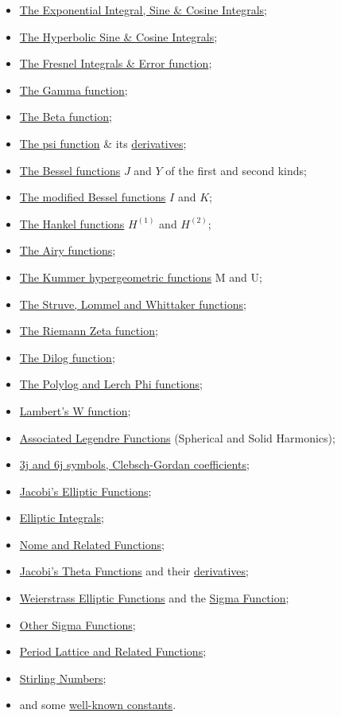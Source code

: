 \begin{itemize}
\item \hyperlink{INTEGF}{The Exponential Integral, Sine \& Cosine Integrals};
\item \hyperlink{INTEGF}{The Hyperbolic Sine \& Cosine Integrals};
\item \hyperlink{INTEGF}{The Fresnel Integrals \& Error function};
\item \hyperlink{GAMMF}{The Gamma function};
\item \hyperlink{BETAF}{The Beta function};
\item \hyperlink{DIGAM}{The psi function} \& its \hyperlink{POLYGAM}{derivatives};
\item \hyperlink{BESSELF}{The Bessel functions} $J$ and $Y$ of the first and second kinds;
\item \hyperlink{BESSELF}{The modified Bessel functions} $I$ and $K$;
\item \hyperlink{BESSELF}{The Hankel functions} $H^{(1)}$ and $H^{(2)}$;
\item \hyperlink{AIRYF}{The Airy functions};
\item \hyperlink{HYPERGEOM}{The Kummer hypergeometric functions} M and U;
\item \hyperlink{HYPERGEOM}{The Struve, Lommel and Whittaker functions};
\item \hyperlink{RIEMZETA}{The Riemann Zeta function};
\item \hyperlink{POLYLOG}{The Dilog function};
\item \hyperlink{POLYLOG}{The Polylog and Lerch Phi functions};
\item \hyperlink{LAMBERTW}{Lambert's W function};
\item \hyperlink{SPHSOLH}{Associated Legendre Functions}
(Spherical and Solid Harmonics);
\item \hyperlink{CLEBSCHG}{3j and 6j symbols, Clebsch-Gordan coefficients};
\item \hyperlink{JACEF}{Jacobi's Elliptic Functions};
\item \hyperlink{ELLIPI}{Elliptic Integrals};
\item \hyperlink{ELLIPNOME}{Nome and Related Functions};
\item \hyperlink{JACTF}{Jacobi's Theta Functions} and their
\hyperlink{THETAD}{ derivatives};
\item \hyperlink{WEIERSTRASS}{Weierstrass Elliptic Functions} and the
\hyperlink{SIGMA}{Sigma Function};
\item \hyperlink{SIGMA1}{Other Sigma Functions};
\item \hyperlink{ETA}{Period Lattice and Related Functions};
\item \hyperlink{STIRL}{Stirling Numbers};
\item and some \hyperlink{CONSTS}{well-known constants}.
\end{itemize}


